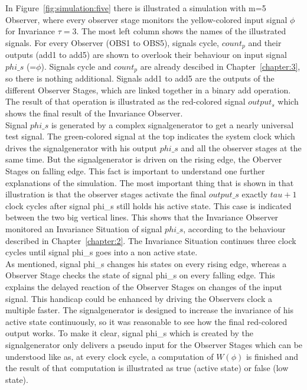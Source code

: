 In Figure~\ref{fig:simulation:five} there is illustrated a simulation with m=5 Observer, where every observer stage monitors the yellow-colored input signal $\phi$ for Invariance $\tau=3$.
The most left column shows the names of the illustrated signals. For every Observer (OBS1 to OBS5), signals cycle, $count_p$ and their outputs (add1 to add5) are shown to overlook their
behaviour on input signal $phi\_s$ (=$\phi$). Signals cycle and $count_p$ are already descibed in Chapter~\ref{chapter:3}, so there is nothing additional.
Signals add1 to add5 are the outputs of the different Observer Stages, which are linked together in a binary add operation.
The result of that operation is illustrated as the red-colored signal $output_s$ which shows the final result of the Invariance Observer.\\
Signal $phi\_s$ is generated by a complex signalgenerator to get a nearly universal test signal. The green-colored signal at the top indicates the system clock which drives the signalgenerator
with his output $phi\_s$ and all the observer stages at the same time. But the signalgenerator is driven on the rising edge, the Oberver Stages on falling edge.
This fact is important to understand one further explanations of the simulation. 
The most important thing that is shown in that illustration is that the observer stages activate the final $output\_s$ exactly $tau + 1$  clock cycles after signal phi\_s still holds his active state.
This case is  indicated between the two big vertical lines. 
This shows that the Invariance Observer monitored an Invariance Situation of signal $phi\_s$, according to the behaviour described in Chapter~\ref{chapter:2}. 
The Invariance Situation continues three clock cycles until signal phi\_s goes into a non active state. \\
As mentioned, signal phi\_s changes his states on every rising edge, whereas a Observer Stage checks the state of signal phi\_s on every falling edge. 
This explains the delayed reaction of the Observer Stages on changes of the input signal. This handicap could be enhanced by driving the Observers clock a multiple faster.
The signalgenerator is designed to increase the invariance of his active state continuously, so it was reasonable to see how the final red-colored output works. 
To make it clear, signal phi\_s which is created by the signalgenerator only delivers a pseudo input for the Observer Stages which can be understood like as, at every clock cycle, a computation of
$W(\phi)$ is finished and the result of that computation is illustrated as true (active state) or false (low state). 
